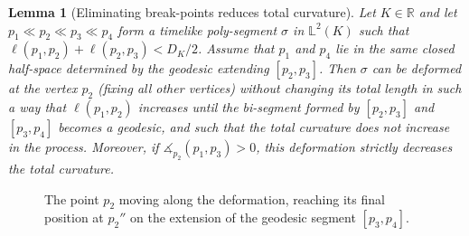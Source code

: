 \documentclass[hidelinks,12pt,a4paper]{article}
\numberwithin{equation}{section}
\theoremstyle{plain}
\newtheorem{lemma}[definition]{Lemma}
\theoremstyle{definition}
\newcommand{\R}{\mathbb R}
\newcommand{\lm}[1]{\mathbb{L}^2(#1)}
\newcommand{\ma}{\ensuremath{\measuredangle}}
\begin{document}
\begin{lemma}[Eliminating break-points reduces total curvature]
\label{deformation2}
Let $K \in \R$ and let $p_1 \ll p_2 \ll p_3 \ll p_4$ form a timelike poly-segment $\sigma$ in $\lm{K}$ such that $\ell(p_1,p_2) + \ell(p_2,p_3) < D_K/2$. 
Assume that $p_1$ and $p_4$ lie in the same closed half-space determined by the geodesic extending $[p_2,p_3]$.
Then $\sigma$ can be deformed at the vertex $p_2$ (fixing all other vertices) without changing its total length in such a way that $\ell(p_1,p_2)$ increases until the bi-segment formed by $[p_2,p_3]$ and $[p_3,p_4]$ becomes a geodesic, and such that the total curvature does not increase in the process.
Moreover, if $\ma_{p_2}(p_1,p_3)>0$, this deformation strictly decreases the total curvature.
\end{lemma}
\begin{figure}[htbp]
\begin{center}
\end{center}
\caption{The point $p_2$ moving along the deformation, reaching its final position at $p_2''$ on the extension of the geodesic segment $[p_3,p_4]$.}
\label{fig: deformation}
\end{figure}
\end{document}

